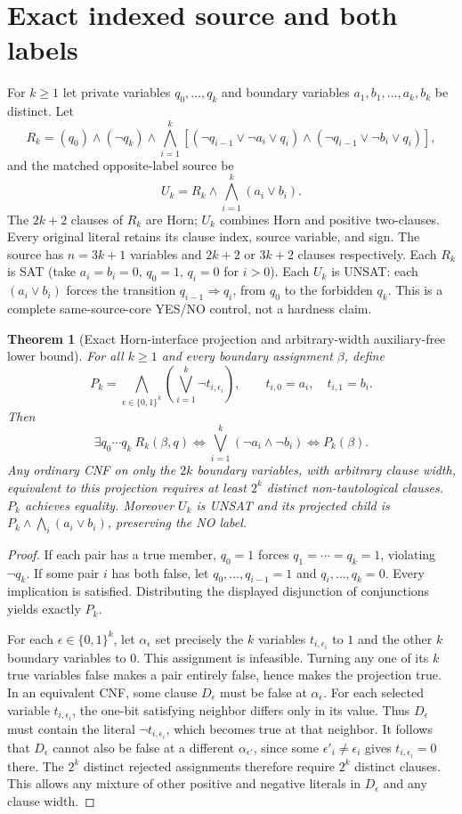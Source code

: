 \documentclass[11pt]{article}
\newtheorem{theorem}{Theorem}
\begin{document}
\section{Exact indexed source and both labels}
For $k\ge1$ let private variables $q_0,\dots,q_k$ and boundary variables $a_1,b_1,\dots,a_k,b_k$ be distinct. Let
\[
R_k=(q_0)\wedge(\neg q_k)\wedge\bigwedge_{i=1}^{k}
[(\neg q_{i-1}\lor\neg a_i\lor q_i)\wedge
 (\neg q_{i-1}\lor\neg b_i\lor q_i)],
\]
and the matched opposite-label source be
\[
U_k=R_k\wedge\bigwedge_{i=1}^k(a_i\lor b_i).
\]
The $2k+2$ clauses of $R_k$ are Horn; $U_k$ combines Horn and positive two-clauses. Every original literal retains its clause index, source variable, and sign. The source has $n=3k+1$ variables and $2k+2$ or $3k+2$ clauses respectively. Each $R_k$ is SAT (take $a_i=b_i=0$, $q_0=1$, $q_i=0$ for $i>0$). Each $U_k$ is UNSAT: each $(a_i\lor b_i)$ forces the transition $q_{i-1}\Rightarrow q_i$, from $q_0$ to the forbidden $q_k$. This is a complete same-source-core YES/NO control, not a hardness claim.

\begin{theorem}[Exact Horn-interface projection and arbitrary-width auxiliary-free lower bound]
For all $k\ge1$ and every boundary assignment $\beta$, define
\[
P_k=\bigwedge_{\epsilon\in\{0,1\}^k}
\left(\bigvee_{i=1}^k\neg t_{i,\epsilon_i}\right),
\qquad t_{i,0}=a_i,\quad t_{i,1}=b_i.
\]
Then
\[
\exists q_0\cdots q_k\ R_k(\beta,q)
\iff\bigvee_{i=1}^k(\neg a_i\wedge\neg b_i)
\iff P_k(\beta).
\]
Any ordinary CNF on \emph{only the $2k$ boundary variables}, with arbitrary clause width, equivalent to this projection requires at least $2^k$ distinct non-tautological clauses. $P_k$ achieves equality. Moreover $U_k$ is UNSAT and its projected child is $P_k\land\bigwedge_i(a_i\lor b_i)$, preserving the NO label.
\end{theorem}
\begin{proof}
If each pair has a true member, $q_0=1$ forces $q_1=\cdots=q_k=1$, violating $\neg q_k$. If some pair $i$ has both false, let $q_0,\dots,q_{i-1}=1$ and $q_i,\dots,q_k=0$. Every implication is satisfied. Distributing the displayed disjunction of conjunctions yields exactly $P_k$.

For each $\epsilon\in\{0,1\}^k$, let $\alpha_\epsilon$ set precisely the $k$ variables $t_{i,\epsilon_i}$ to $1$ and the other $k$ boundary variables to $0$. This assignment is infeasible. Turning any one of its $k$ true variables false makes a pair entirely false, hence makes the projection true. In an equivalent CNF, some clause $D_\epsilon$ must be false at $\alpha_\epsilon$. For each selected variable $t_{i,\epsilon_i}$, the one-bit satisfying neighbor differs only in its value. Thus $D_\epsilon$ must contain the literal $\neg t_{i,\epsilon_i}$, which becomes true at that neighbor. It follows that $D_\epsilon$ cannot also be false at a different $\alpha_{\epsilon'}$, since some $\epsilon'_i\ne\epsilon_i$ gives $t_{i,\epsilon_i}=0$ there. The $2^k$ distinct rejected assignments therefore require $2^k$ distinct clauses. This allows any mixture of other positive and negative literals in $D_\epsilon$ and any clause width.\qedhere
\end{proof}
\end{document}
